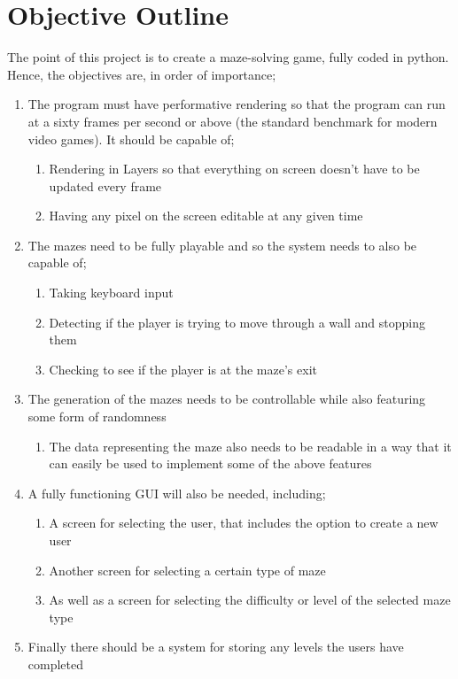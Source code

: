 \documentclass{article}
\begin{document}
\section{Objective Outline}
The point of this project is to create a maze-solving game, fully coded in python. Hence, the objectives are, in order of importance; 
\begin{enumerate}
	\item The program must have performative rendering so that the program can run at a sixty frames per second or above (the standard benchmark for modern video games). It should be capable of;
	\begin{enumerate}
		\item Rendering in Layers so that everything on screen doesn't have to be updated every frame
		\item Having any pixel on the screen editable at any given time
	\end{enumerate}
	\item The mazes need to be fully playable and so the system needs to also be capable of;
	\begin{enumerate}
		\item Taking keyboard input 
		\item Detecting if the player is trying to move through a wall and stopping them
		\item Checking to see if the player is at the maze's exit
	\end{enumerate}
	\item The generation of the mazes needs to be controllable while also featuring some form of randomness
	\begin{enumerate}
		\item The data representing the maze also needs to be readable in a way that it can easily be used to implement some of the above features
	\end{enumerate}
	\item A fully functioning GUI will also be needed, including;
	\begin{enumerate}
		\item A screen for selecting the user, that includes the option to create a new user
		\item Another screen for selecting a certain type of maze
		\item As well as a screen for selecting the difficulty or level of the selected maze type
	\end{enumerate}
	\item Finally there should be a system for storing any levels the users have completed
\end{enumerate}
\end{document}

